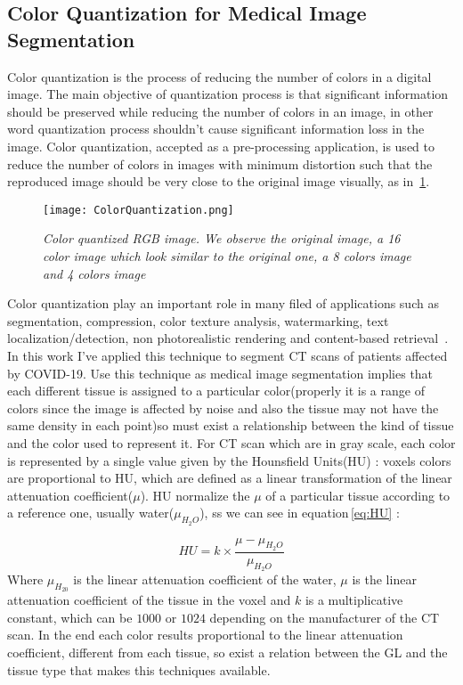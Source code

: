 \documentclass{standalone}
\begin{document}
	\subsection{Color Quantization for Medical Image Segmentation}
	

	Color quantization is the process of reducing the number of colors in a digital image. The main objective of quantization process is that 
	significant information should be preserved while reducing the number of colors in an image, in other word quantization process shouldn’t cause 
	significant information loss in the image. 
	Color quantization, accepted as a pre-processing application, is used to reduce the number of colors in images with minimum distortion such that the 
	reproduced image should be very close to the original image visually, as in \figurename\,\ref{fig:ColorQuantization}. 

	\begin{figure}[h!]
		\label{fig:ColorQuantization}
		\centering
			\texttt{[image: ColorQuantization.png]}
		\caption{\textit{Color quantized RGB image. We observe the original image, a 16 color image which look similar to the original one, a 8 colors image and 4 colors image}}
	\end{figure}

	Color quantization play an important role in many filed of applications such as segmentation, compression, color texture analysis, watermarking, 
	text localization/detection, non photorealistic rendering and content-based retrieval~\cite{ART:Ozturk}.\\
	
	
	In this work I've applied this technique to segment CT scans of patients affected by COVID-19. Use this technique as medical image segmentation implies that each different tissue is assigned to a particular color(properly it is a range of colors since the image is affected by noise and also the tissue may not have the same density in each point)so must exist a relationship between the kind of tissue and the color used to represent it. 
	For CT scan which are in gray scale, each color is represented by a single value given by the Hounsfield Units(HU) : voxels colors are proportional to HU, which are defined as a linear transformation of the linear attenuation coefficient($\mu$). HU normalize the $\mu$ of a particular tissue according to a reference one, usually water($\mu_{H_2 O}$), ss we can see in equation\,\ref{eq:HU} : 
	
	\begin{equation}\label{eq:HU}
		HU = k\times\frac{\mu - \mu_{H_2 O}}{\mu_{H_2 O}}
	\end{equation}
	Where $\mu_{H_20}$ is the linear attenuation coefficient of the water, $\mu$ is the linear attenuation coefficient of the tissue in the voxel and $k$ is a multiplicative constant, which can be $1000$ or $1024$ depending on the manufacturer of the CT scan.	
	In the end each color results proportional to the linear attenuation coefficient, different from each tissue, so exist a relation between the GL and the tissue type that makes this techniques available. \\
	
\end{document}
